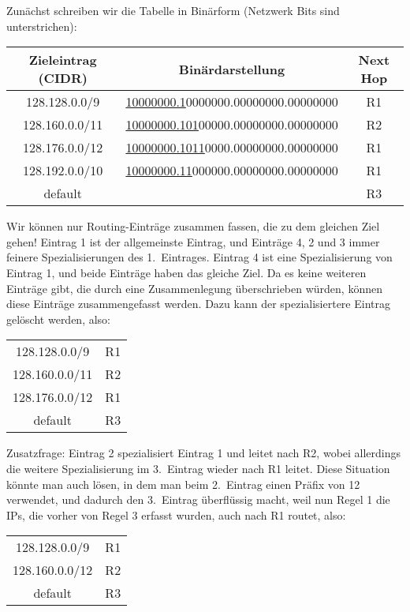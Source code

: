 Zunächst schreiben wir die Tabelle in Binärform (Netzwerk Bits sind unterstrichen):

\begin{center}
    \begin{tabular}{|c | c | c|}
        \hline
        Zieleintrag (CIDR) & Binärdarstellung & Next Hop \tabularnewline
        \hline
        128.128.0.0/9 & \underline{10000000.1}0000000.00000000.00000000 & R1 \tabularnewline
        128.160.0.0/11 & \underline{10000000.101}00000.00000000.00000000 & R2 \tabularnewline
        128.176.0.0/12 & \underline{10000000.1011}0000.00000000.00000000 & R1 \tabularnewline
        128.192.0.0/10 & \underline{10000000.11}000000.00000000.00000000 & R1 \tabularnewline
        default & & R3 \tabularnewline
        \hline
    \end{tabular}
\end{center}

Wir können nur Routing-Einträge zusammen fassen, die zu dem gleichen Ziel gehen!
Eintrag 1 ist der allgemeinste Eintrag, und Einträge 4, 2 und 3 immer feinere Spezialisierungen des 1.\ Eintrages.
Eintrag 4 ist eine Spezialisierung von Eintrag 1, und beide Einträge haben das gleiche Ziel.
Da es keine weiteren Einträge gibt, die durch eine Zusammenlegung überschrieben würden, können diese Einträge zusammengefasst werden.
Dazu kann der spezialisiertere Eintrag gelöscht werden, also:

\begin{center}
    \begin{tabular}{|c|c|}
        \hline
        128.128.0.0/9 & R1 \tabularnewline
        128.160.0.0/11 & R2 \tabularnewline
        128.176.0.0/12 & R1 \tabularnewline
        default & R3 \tabularnewline
        \hline
    \end{tabular}
\end{center}

Zusatzfrage:
Eintrag 2 spezialisiert Eintrag 1 und leitet nach R2, wobei allerdings die weitere Spezialisierung im 3.\ Eintrag wieder nach R1 leitet.
Diese Situation könnte man auch lösen, in dem man beim 2.\ Eintrag einen Präfix von 12 verwendet,
und dadurch den 3.\ Eintrag überflüssig macht, weil nun Regel 1 die IPs, die vorher von Regel 3 erfasst wurden, auch nach R1 routet, also:

\begin{center}
    \begin{tabular}{|c|c|}
        \hline
        128.128.0.0/9 & R1 \tabularnewline
        128.160.0.0/12 & R2 \tabularnewline
        default & R3 \tabularnewline
        \hline
    \end{tabular}
\end{center}